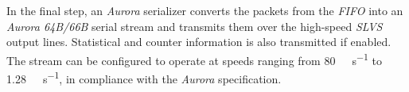 In the final step, an \emph{Aurora} serializer converts the packets from the \emph{FIFO} into an \emph{Aurora 64B/66B} serial stream and transmits them over the high-speed \emph{SLVS} output lines. Statistical and counter information is also transmitted if enabled. The stream can be configured to operate at speeds ranging from \SI{80}{\mega\bit\per\second} to \SI{1.28}{\giga\bit\per\second}, in compliance with the \emph{Aurora} specification. \cite{ficDatasheet}


